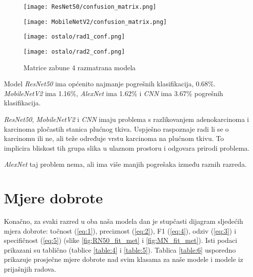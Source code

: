 \documentclass[conference, utf8]{IEEEtran}
\begin{document}
	
	\begin{figure}[H]
		
		\begin{center}
			\begin{minipage}{0.49\columnwidth}
				\texttt{[image: ResNet50/confusion\_matrix.png]}
				\label{conf:1}
			\end{minipage}
			\begin{minipage}{0.49\columnwidth}
			\texttt{[image: MobileNetV2/confusion\_matrix.png]}
				\label{conf:2}
			\end{minipage}
			\begin{minipage}{0.49\columnwidth}
			\texttt{[image: ostalo/rad1\_conf.png]}
				\label{conf:3}
			\end{minipage}
			\begin{minipage}{0.49\columnwidth}
			\texttt{[image: ostalo/rad2\_conf.png]}
				\label{conf:4}
			\end{minipage}


		\end{center}
		
		\caption{Matrice zabune 4 razmatrana modela}
		
	\end{figure}
	
	
	
	
	
	
	Model \textit{ResNet50} ima općenito najmanje pogrešnih klasifikacija, 0.68\%. \textit{MobileNetV2} ima 1.16\%, \textit{AlexNet}\cite{RAD1} ima 1.62\%  i \textit{CNN}\cite{RAD2} ima 3.67\% pogrešnih klasifikacija. 
	
	\textit{ResNet50}, \textit{MobileNetV2} i \textit{CNN}\cite{RAD2} imaju problema s razlikovanjem adenokarcinoma i karcinoma pločastih stanica plućnog tkiva. Uspješno raspoznaje radi li se o karcinomu ili ne, ali teže određuje vrstu karcinoma na plućnom tkivu. To implicira bliskost tih grupa slika u ulaznom prostoru i odgovara prirodi problema.
	
	 \textit{AlexNet}\cite{RAD1} taj problem nema, ali ima više manjih pogrešaka između raznih razreda. 
	
	
	
	\section{Mjere dobrote}
	Konačno, za svaki razred u oba naša modela dan je stupčasti dijagram sljedećih mjera dobrote: točnost (\ref{eq:1}), preciznost (\ref{eq:2}), F1 (\ref{eq:4}), odziv (\ref{eq:3}) i specifičnost (\ref{eq:5}) (slike \ref{fig:RN50_fit_met} i \ref{fig:MN_fit_met}). Isti podaci prikazani su tablično (tablice \ref{table:4} i \ref{table:5}). Tablica \ref{table:6} usporedno prikazuje prosječne mjere dobrote nad svim klasama za naše modele i modele iz prijašnjih radova.
	
\end{document}
